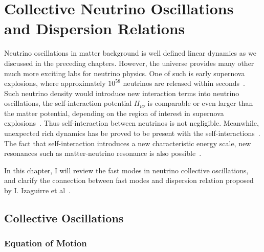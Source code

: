 
\chapter{\label{chap:dr}Collective Neutrino Oscillations and Dispersion Relations}

Neutrino oscillations in matter background is well defined linear dynamics as we discussed in the preceding chapters. However, the universe provides many other much more exciting labs for neutrino physics. One of such is early supernova explosions, where approximately $10^{58}$ neutrinos are released within seconds~\cite{Bahcall1987}. Such neutrino density would introduce new interaction terms into neutrino oscillations, the self-interaction potential $H_{\nu\nu}$ is comparable or even larger than the matter potential, depending on the region of interest in supernova explosions~\cite{Flowers1976a}. Thus self-interaction between neutrinos is not negligible. Meanwhile, unexpected rich dynamics has be proved to be present with the self-interactions~\cite{Duan2010, Duan2006}. The fact that self-interaction introduces a new characteristic energy scale, new resonances such as matter-neutrino resonance is also possible~\cite{Malkus2014, Vaananen2015, Wu2015}.

In this chapter, I will review the fast modes in neutrino collective oscillations, and clarify the connection between fast modes and dispersion relation proposed by I. Izaguirre et al~\cite{Izaguirre2016a}.



\section{\label{chap:dr-sec:collective}Collective Oscillations}





\subsection{Equation of Motion}

